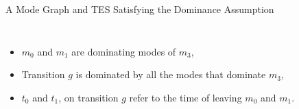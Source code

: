 \documentclass[10pt]{beamer}
\theoremstyle{plain}
\theoremstyle{definition}
\begin{document}
\begin{frame}{A Mode Graph and TES Satisfying the Dominance Assumption}
\begin{columns}
\begin{column}{0.5\textwidth}
\begin{figure}
\begin{adjustbox}{max totalsize={.80\textwidth}{.80\textheight},center}
			\end{adjustbox}
			\end{figure} 
		\end{column}
	\end{columns}
	\begin{itemize}
		\item $m_0$ and $m_1$ are dominating modes of $m_3$,
		\item Transition $g$ is dominated by all the modes that dominate $m_3$,
		\item $t_0$ and $t_1$, on transition $g$ refer to the time of leaving $m_0$ and $m_1$.
	\end{itemize}
\end{frame}
\end{document}
